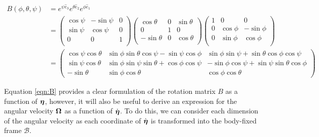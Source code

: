 \documentclass{article}
\begin{document}
\begin{align}
    B(\phi, \theta, \psi)
    & = 
    e^{\psi \hat{e}_3}
    e^{\theta \hat{e}_2}
    e^{\phi \hat{e}_1}
    \\
    & = 
    \begin{pmatrix}
        \cos{\psi} & -\sin{\psi} & 0 \\
        \sin{\psi} & \cos{\psi} & 0 \\
        0 & 0 & 1 \\
    \end{pmatrix}
    \begin{pmatrix}
        \cos{\theta} & 0 & \sin{\theta} \\
        0 & 1 & 0 \\
        -\sin{\theta} & 0 & \cos{\theta} \\
    \end{pmatrix}
    \begin{pmatrix}
        1 & 0 & 0 \\
        0 & \cos{\phi} & -\sin{\phi} \\
        0 & \sin{\phi} & \cos{\phi} \\
    \end{pmatrix} \\
     & = 
     \begin{pmatrix}
     \cos{\psi } \cos{\theta } & \sin{\phi } \sin{\theta } \cos{\psi } - \sin{\psi } \cos{\phi } & \sin{\phi } \sin{\psi } + \sin{\theta } \cos{\phi } \cos{\psi }\\\sin{\psi } \cos{\theta } & \sin{\phi } \sin{\psi } \sin{\theta } + \cos{\phi } \cos{\psi } & - \sin{\phi } \cos{\psi } + \sin{\psi } \sin{\theta } \cos{\phi }\\- \sin{\theta } & \sin{\phi } \cos{\theta } & \cos{\phi } \cos{\theta }
     \end{pmatrix}
     \label{eqn:B}
\end{align}

Equation \ref{eqn:B} provides a clear formulation of the rotation matrix $B$ as a function of $\boldsymbol{\eta}$, however, it will also be useful to derive an expression for the angular velocity $\boldsymbol{\Omega}$ as a function of $\dot{\boldsymbol{\eta}}$. To do this, we can consider each dimension of the angular velocity as each coordinate of $\dot{\boldsymbol{\eta}}$ is transformed into the body-fixed frame $\mathcal{B}$.
\end{document}
